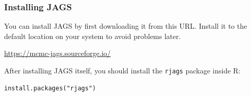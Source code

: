 \documentclass{beamer}
\begin{document}
\begin{frame}[fragile]
\frametitle{Installing JAGS}
You can install JAGS by first downloading it from this URL. Install it to
the default location on your system to avoid problems later.

\begin{center}
\url{https://mcmc-jags.sourceforge.io/}
\end{center}

\pause

After installing JAGS itself, you should install the \texttt{rjags}
package inside R:
\begin{verbatim}
install.packages("rjags")
\end{verbatim}

\end{frame}
\end{document}
